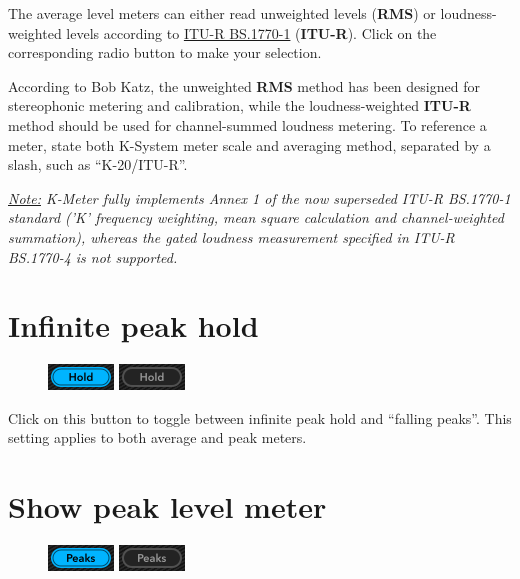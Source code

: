 The average level meters can either read unweighted levels
(\textbf{RMS}) or loudness-weighted levels according to
\href{http://www.itu.int/rec/R-REC-BS.1770}{ITU-R BS.1770-1}
(\textbf{ITU-R}).  Click on the corresponding radio button to make
your selection.

According to Bob Katz, the unweighted \textbf{RMS} method has been
designed for stereophonic metering and calibration, while the
loudness-weighted \textbf{ITU-R} method should be used for
channel-summed loudness metering.  To reference a meter, state both
K-System meter scale and averaging method, separated by a slash, such
as ``K-20/ITU-R''.

\emph{\underline{Note:} K-Meter fully implements Annex 1 of the now
  superseded ITU-R BS.1770-1 standard ('K' frequency weighting, mean
  square calculation and channel-weighted summation), whereas the
  gated loudness measurement specified in ITU-R BS.1770-4 is not
  supported.}

\section{Infinite peak hold}

\begin{figure}
\includegraphics[scale=\screenshotscale,clip]{include/images/button_peak_hold_on.png}
\newline \vspace{-0.9\baselineskip}
\includegraphics[scale=\screenshotscale,clip]{include/images/button_peak_hold_off.png}
\end{figure}

Click on this button to toggle between infinite peak hold and
``falling peaks''.  This setting applies to both average and peak
meters.

\section{Show peak level meter}

\begin{figure}
\includegraphics[scale=\screenshotscale,clip]{include/images/button_peak_meter_on.png}
\newline \vspace{-0.9\baselineskip}
\includegraphics[scale=\screenshotscale,clip]{include/images/button_peak_meter_off.png}
\end{figure}

